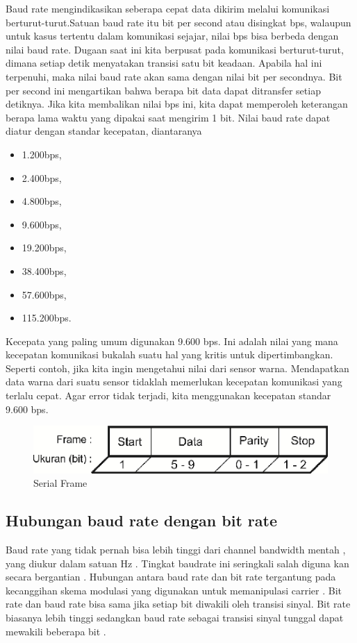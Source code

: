 Baud rate mengindikasikan seberapa cepat data dikirim melalui komunikasi berturut-turut.Satuan baud rate itu bit per second atau disingkat bps, walaupun untuk kasus tertentu dalam komunikasi sejajar, nilai bps bisa berbeda dengan nilai baud rate. Dugaan saat ini kita berpusat pada komunikasi berturut-turut, dimana setiap detik menyatakan transisi satu bit keadaan. Apabila hal ini terpenuhi, maka nilai baud rate akan sama dengan nilai bit per secondnya. Bit per second ini mengartikan bahwa berapa bit data dapat ditransfer setiap detiknya. Jika kita membalikan nilai bps ini, kita dapat memperoleh keterangan berapa lama waktu yang dipakai saat mengirim 1 bit. Nilai baud rate dapat diatur dengan standar kecepatan, diantaranya 
\begin {itemize}
	\item 1.200bps,
	\item 2.400bps, 
	\item 4.800bps, 
	\item 9.600bps, 
	\item 19.200bps, 
	\item 38.400bps, 
	\item 57.600bps,
	\item 115.200bps. 
\end {itemize}	
	Kecepata yang paling umum digunakan 9.600 bps. Ini adalah nilai yang mana kecepatan komunikasi bukalah suatu hal yang kritis untuk dipertimbangkan. Seperti contoh, jika kita ingin mengetahui nilai dari sensor warna. Mendapatkan data warna dari suatu sensor tidaklah memerlukan kecepatan komunikasi yang terlalu cepat. Agar  error tidak terjadi, kita menggunakan kecepatan standar 9.600 bps.

\begin{figure}[ht]
	\centerline{\includegraphics[width=1\textwidth]{figures/serialframe.png}}
	\caption{Serial Frame}
	\label{serialframe}
\end{figure}
\subsection{ Hubungan baud rate dengan bit rate}
Baud rate yang tidak pernah bisa lebih tinggi dari channel bandwidth mentah , yang diukur dalam satuan Hz . Tingkat baudrate ini seringkali salah diguna kan secara bergantian . Hubungan antara baud rate dan bit rate tergantung pada kecanggihan skema modulasi yang digunakan untuk memanipulasi carrier . Bit rate dan baud rate bisa sama jika setiap bit diwakili oleh transisi sinyal. Bit rate biasanya lebih tinggi sedangkan baud rate sebagai transisi sinyal tunggal dapat mewakili beberapa bit .
